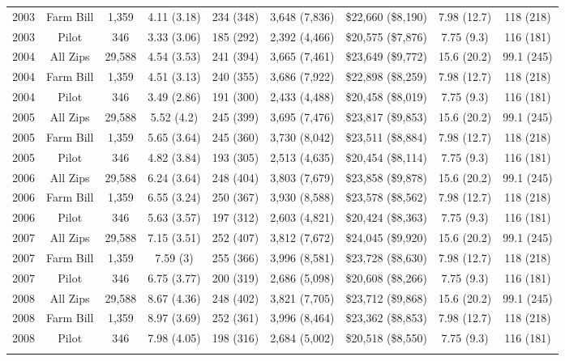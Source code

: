 \begin{table}[!htbp]
\begin{tabular}{@{\extracolsep{5pt}} ccccccccc}
2003 & Farm Bill & 1,359 & 4.11 (3.18) & 234 (348) & 3,648 (7,836) & \$22,660 (\$8,190) & 7.98 (12.7) & 118 (218) \\ 
2003 & Pilot & 346 & 3.33 (3.06) & 185 (292) & 2,392 (4,466) & \$20,575 (\$7,876) & 7.75 (9.3) & 116 (181) \\ 
2004 & All Zips & 29,588 & 4.54 (3.53) & 241 (394) & 3,665 (7,461) & \$23,649 (\$9,772) & 15.6 (20.2) & 99.1 (245) \\ 
2004 & Farm Bill & 1,359 & 4.51 (3.13) & 240 (355) & 3,686 (7,922) & \$22,898 (\$8,259) & 7.98 (12.7) & 118 (218) \\ 
2004 & Pilot & 346 & 3.49 (2.86) & 191 (300) & 2,433 (4,488) & \$20,458 (\$8,019) & 7.75 (9.3) & 116 (181) \\ 
2005 & All Zips & 29,588 & 5.52 (4.2) & 245 (399) & 3,695 (7,476) & \$23,817 (\$9,853) & 15.6 (20.2) & 99.1 (245) \\ 
2005 & Farm Bill & 1,359 & 5.65 (3.64) & 245 (360) & 3,730 (8,042) & \$23,511 (\$8,884) & 7.98 (12.7) & 118 (218) \\ 
2005 & Pilot & 346 & 4.82 (3.84) & 193 (305) & 2,513 (4,635) & \$20,454 (\$8,114) & 7.75 (9.3) & 116 (181) \\ 
2006 & All Zips & 29,588 & 6.24 (3.64) & 248 (404) & 3,803 (7,679) & \$23,858 (\$9,878) & 15.6 (20.2) & 99.1 (245) \\ 
2006 & Farm Bill & 1,359 & 6.55 (3.24) & 250 (367) & 3,930 (8,588) & \$23,578 (\$8,562) & 7.98 (12.7) & 118 (218) \\ 
2006 & Pilot & 346 & 5.63 (3.57) & 197 (312) & 2,603 (4,821) & \$20,424 (\$8,363) & 7.75 (9.3) & 116 (181) \\ 
2007 & All Zips & 29,588 & 7.15 (3.51) & 252 (407) & 3,812 (7,672) & \$24,045 (\$9,920) & 15.6 (20.2) & 99.1 (245) \\ 
2007 & Farm Bill & 1,359 & 7.59 (3) & 255 (366) & 3,996 (8,581) & \$23,728 (\$8,630) & 7.98 (12.7) & 118 (218) \\ 
2007 & Pilot & 346 & 6.75 (3.77) & 200 (319) & 2,686 (5,098) & \$20,608 (\$8,266) & 7.75 (9.3) & 116 (181) \\ 
2008 & All Zips & 29,588 & 8.67 (4.36) & 248 (402) & 3,821 (7,705) & \$23,712 (\$9,868) & 15.6 (20.2) & 99.1 (245) \\ 
2008 & Farm Bill & 1,359 & 8.97 (3.69) & 252 (361) & 3,996 (8,464) & \$23,362 (\$8,853) & 7.98 (12.7) & 118 (218) \\ 
2008 & Pilot & 346 & 7.98 (4.05) & 198 (316) & 2,684 (5,002) & \$20,518 (\$8,550) & 7.75 (9.3) & 116 (181) \\ 
\hline \\[-1.8ex] 
\end{tabular} 
\end{table} 
